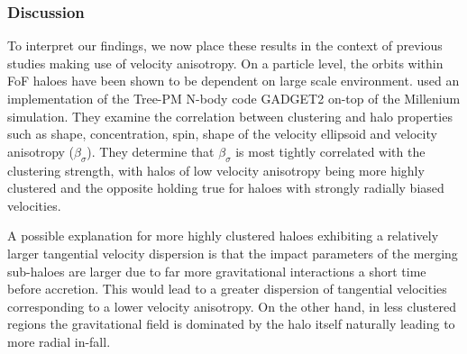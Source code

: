 \subsubsection{Discussion}
To interpret our findings, we now place these results in the context of previous studies making use of velocity anisotropy. On a particle level, the orbits within FoF haloes have been shown to be dependent on large scale environment. \citet{faltenbacher2010} used an implementation of the Tree-PM N-body code GADGET2 on-top of the Millenium simulation. They examine the correlation between clustering and halo properties such as shape, concentration, spin, shape of the velocity ellipsoid and velocity anisotropy ($\beta_{\sigma}$). They determine that $\beta_{\sigma}$ is most tightly correlated with the clustering strength, with halos of low velocity anisotropy being more highly clustered and the opposite holding true for haloes with strongly radially biased velocities. 

A possible explanation for more highly clustered haloes exhibiting a relatively larger tangential velocity dispersion is that the impact parameters of the merging sub-haloes are larger due to far more gravitational interactions a short time before accretion. This would lead to a greater dispersion of tangential velocities corresponding to a lower velocity anisotropy. On the other hand, in less clustered regions the gravitational field is dominated by the halo itself naturally leading to more radial in-fall. 

